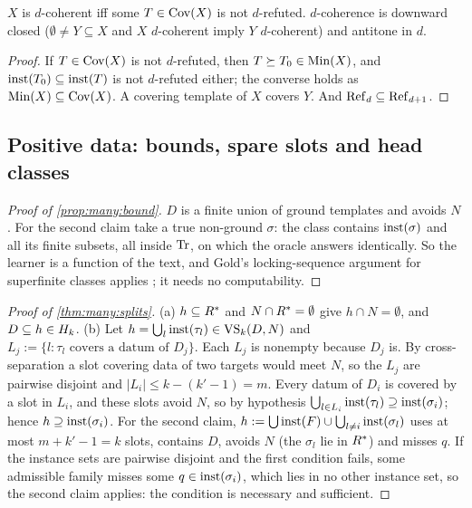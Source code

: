 \begin{lemma}\label{lem:many:mono}
$X$ is $d$-coherent iff some $T\in\mathrm{Cov}(X)$ is not $d$-refuted. $d$-coherence is downward closed ($\emptyset\neq
Y\subseteq X$ and $X$ $d$-coherent imply $Y$ $d$-coherent) and antitone in $d$.
\end{lemma}
\begin{proof}
If $T\in\mathrm{Cov}(X)$ is not $d$-refuted, then $T\succeq T_0\in\mathrm{Min}(X)$, and $\mathrm{inst}(T_0)\subseteq\mathrm{inst}(T)$ is not $d$-refuted
either; the converse holds as $\mathrm{Min}(X)\subseteq\mathrm{Cov}(X)$. A covering template of $X$ covers $Y$. And
$\mathrm{Ref}_d\subseteq\mathrm{Ref}_{d+1}$.
\end{proof}

\subsection{Positive data: bounds, spare slots and head classes}\label{app:many:bound}

\begin{proof}[Proof of \cref{prop:many:bound}]
$D$ is a finite union of ground templates and avoids $N$. For the second claim take a true non-ground $\sigma$: the class
contains $\mathrm{inst}(\sigma)$ and all its finite subsets, all inside $\mathrm{Tr}$, on which the oracle answers identically. So the
learner is a function of the text, and Gold's locking-sequence argument for superfinite classes applies
\citep{gold1967language}; it needs no computability.
\end{proof}

\begin{proof}[Proof of \cref{thm:many:splits}]
(a) $h\subseteq R^{*}$ and $N\cap R^{*}=\emptyset$ give $h\cap N=\emptyset$, and $D\subseteq h\in H_{k}$.
(b) Let $h=\bigcup_l\mathrm{inst}(\tau_l)\in\mathrm{VS}_k(D,N)$ and $L_j:=\{l:\tau_l\text{ covers a datum of }D_j\}$. Each $L_j$ is
nonempty because $D_j$ is. By cross-separation a slot covering data of two targets would meet $N$, so the $L_j$ are
pairwise disjoint and $|L_i|\le k-(k'-1)=m$. Every datum of $D_i$ is covered by a slot in $L_i$, and these slots avoid
$N$, so by hypothesis $\bigcup_{l\in L_i}\mathrm{inst}(\tau_l)\supseteq\mathrm{inst}(\sigma_i)$; hence $h\supseteq\mathrm{inst}(\sigma_i)$.
For the second claim, $h:=\bigcup\mathrm{inst}(F)\cup\bigcup_{l\neq i}\mathrm{inst}(\sigma_l)$ uses at most $m+k'-1=k$ slots, contains $D$,
avoids $N$ (the $\sigma_l$ lie in $R^{*}$) and misses $q$. If the instance sets are pairwise disjoint and the first
condition fails, some admissible family misses some $q\in\mathrm{inst}(\sigma_i)$, which lies in no other instance set, so the
second claim applies: the condition is necessary and sufficient.
\end{proof}

